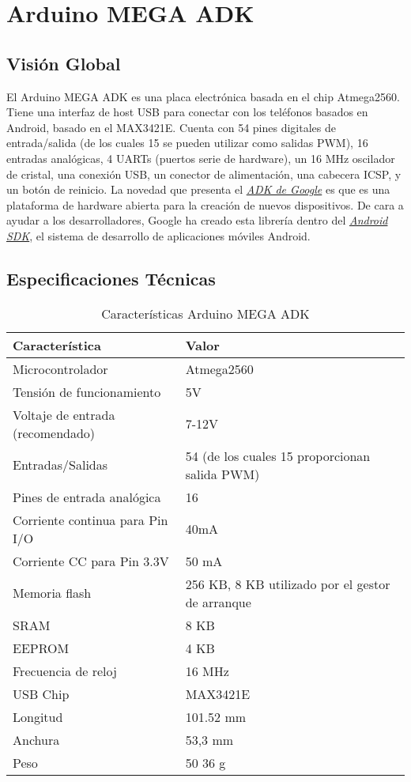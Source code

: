 \chapter{Arduino MEGA ADK}
\label{chap:anexo1}

\section{Visión Global}

El Arduino MEGA ADK es una placa electrónica basada en el chip Atmega2560. Tiene una interfaz de host USB para conectar con los teléfonos basados en Android, basado en el MAX3421E. Cuenta con 54 pines digitales de entrada/salida (de los cuales 15 se pueden utilizar como salidas PWM), 16 entradas analógicas, 4 UARTs (puertos serie de hardware), un 16 MHz oscilador de cristal, una conexión USB, un conector de alimentación, una cabecera ICSP, y un botón de reinicio\cite{ArduinoMegaADK}. La novedad que presenta el \href{https://developer.android.com/adk/index.html}{\textit{ADK de Google}} es que es una plataforma de hardware abierta para la creación de nuevos dispositivos. De cara a ayudar a los desarrolladores, Google ha creado esta librería dentro del \href{http://android-sdk.uptodown.com/windows}{\textit{Android \acs{SDK}}}, el sistema de desarrollo de aplicaciones móviles Android.

\section{Especificaciones Técnicas}

 \begin{table}[h!]
  \centering
  \caption{Características Arduino MEGA ADK \cite{ArduinoMegaADK}}
  \label{tab:ADK}
  \begin{tabular}{p{}p{}}
    \hline
    \textbf{Característica} & \textbf{Valor} \\
    \hline
    Microcontrolador & Atmega2560 \\
    Tensión de funcionamiento & 5V \\
    Voltaje de entrada (recomendado) & 7-12V \\
    Entradas/Salidas & 54 (de los cuales 15 proporcionan salida PWM) \\
    Pines de entrada analógica & 16 \\
    Corriente continua para Pin I/O & 40mA \\
    Corriente CC para Pin 3.3V & 50 mA \\
    Memoria flash & 256 KB, 8 KB utilizado por el gestor de arranque \\
    SRAM & 8 KB \\
    EEPROM & 4 KB \\
    Frecuencia de reloj & 16 MHz \\
    USB Chip & MAX3421E \\
    Longitud & 101.52 mm \\
    Anchura & 53,3 mm \\
    Peso & 50 36 g \\
    \hline
  \end{tabular}
\end{table}

